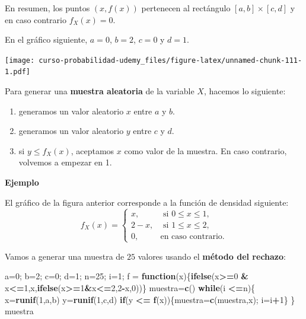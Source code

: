 \documentclass[]{book}
\newenvironment{Shaded}{\begin{snugshade}}{\end{snugshade}}
\newcommand{\ControlFlowTok}[1]{\textcolor[rgb]{0.13,0.29,0.53}{\textbf{#1}}}
\newcommand{\DecValTok}[1]{\textcolor[rgb]{0.00,0.00,0.81}{#1}}
\newcommand{\KeywordTok}[1]{\textcolor[rgb]{0.13,0.29,0.53}{\textbf{#1}}}
\newcommand{\NormalTok}[1]{#1}
\newcommand{\OperatorTok}[1]{\textcolor[rgb]{0.81,0.36,0.00}{\textbf{#1}}}
\newcommand{\StringTok}[1]{\textcolor[rgb]{0.31,0.60,0.02}{#1}}
\begin{document}
En resumen, los puntos \((x,f(x))\) pertenecen al rectángulo \([a,b]\times [c,d]\) y en caso contrario \(f_X(x)=0\).

En el gráfico siguiente, \(a=0\), \(b=2\), \(c=0\) y \(d=1\).

\texttt{[image: curso-probabilidad-udemy\_files/figure-latex/unnamed-chunk-111-1.pdf]}

Para generar una \textbf{muestra aleatoria} de la variable \(X\), hacemos lo siguiente:

\begin{enumerate}
\def\labelenumi{\arabic{enumi})}
\item
  generamos un valor aleatorio \(x\) entre \(a\) y \(b\).
\item
  generamos un valor aleatorio \(y\) entre \(c\) y \(d\).
\item
  si \(y\leq f_X(x)\), aceptamos \(x\) como valor de la muestra. En caso contrario, volvemos a empezar en 1.
\end{enumerate}

\textbf{Ejemplo}

El gráfico de la figura anterior corresponde a la función de densidad siguiente:
\[
f_X(x)=\begin{cases}
x, & \mbox{ si }0\leq x\leq 1,\\
2-x, & \mbox{ si }1\leq x\leq 2,\\
0, & \mbox{en caso contrario.}
\end{cases}
\]

Vamos a generar una muestra de \(25\) valores usando el \textbf{método del rechazo}:

\begin{Shaded}
\begin{Highlighting}[]
\NormalTok{a=}\DecValTok{0}\NormalTok{; b=}\DecValTok{2}\NormalTok{; c=}\DecValTok{0}\NormalTok{; d=}\DecValTok{1}\NormalTok{; n=}\DecValTok{25}\NormalTok{; i=}\DecValTok{1}\NormalTok{;}
\NormalTok{f =}\StringTok{ }\ControlFlowTok{function}\NormalTok{(x)\{}\KeywordTok{ifelse}\NormalTok{(x}\OperatorTok{>=}\DecValTok{0} \OperatorTok{&}\StringTok{ }\NormalTok{x}\OperatorTok{<=}\DecValTok{1}\NormalTok{,x,}\KeywordTok{ifelse}\NormalTok{(x}\OperatorTok{>=}\DecValTok{1}\OperatorTok{&}\NormalTok{x}\OperatorTok{<=}\DecValTok{2}\NormalTok{,}\DecValTok{2}\OperatorTok{-}\NormalTok{x,}\DecValTok{0}\NormalTok{))\}}
\NormalTok{muestra=}\KeywordTok{c}\NormalTok{()}
\ControlFlowTok{while}\NormalTok{(i }\OperatorTok{<=}\NormalTok{n)\{}
\NormalTok{  x=}\KeywordTok{runif}\NormalTok{(}\DecValTok{1}\NormalTok{,a,b)}
\NormalTok{  y=}\KeywordTok{runif}\NormalTok{(}\DecValTok{1}\NormalTok{,c,d)}
  \ControlFlowTok{if}\NormalTok{(y }\OperatorTok{<=}\StringTok{ }\KeywordTok{f}\NormalTok{(x))\{muestra=}\KeywordTok{c}\NormalTok{(muestra,x); i=i}\OperatorTok{+}\DecValTok{1}\NormalTok{\}}
\NormalTok{\}}
\NormalTok{muestra}
\end{Highlighting}
\end{Shaded}
\end{document}
